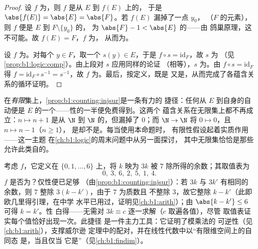 \begin{proof}
设 $f$ 为，则 $f$ 是从 $E$ 到 $f(E)$ 上的，
于是 $\abs{f(E)} = \abs{E} = \abs{F}$。若 $f(E)$ 漏掉了一点 $y_0$，
（$F$ 的元素），则 $f$ 便是 $E$ 到 $F \setminus \{y_0\}$ 的，
为 $\abs{F} - 1 < \abs{E}$ 的——由
鸽巢原理，这不可能。故 $f(E) = F$，$f$ 为，
从而为。

设 $f$ 为。对每个 $y \in F$，取一个 $s(y)
\in E$，于是 $f \circ s = \mathrm{id}_F$，故 $s$ 为
（见\cref{prop:b1:logic:comp}）。由上段对 $s$ 应用同样的论证
（相等），$s$ 为。由 $f \circ s =
\mathrm{id}_F$ 得 $f = \mathrm{id}_F \circ s^{-1} = s^{-1}$，故
$f$ 为。最后，按定义，既是
又是，从而完成了各蕴含关系的循环证明。
\end{proof}

\begin{example}[有限性至关重要]\label{ex:b1:counting:finiteonly}
在\emph{有限}集上，\cref{prop:b1:counting:injsur}是一条有力的
捷径：任何从 $E$ 到自身的自动便是
$E$ 的一个——性的一半便免费得到。这两个
蕴含关系在无限集上都不再成立：$n \mapsto n + 1$
是从 $\N$ 到 $\N$ 的，但漏掉了 $0$；而 $\N \to \N$
将 $0 \mapsto 0$，且 $n \mapsto n - 1$（$n \geq 1$），
是却不是。每当使用本命题时，
有限性假设起着实质作用——这一主题
在\cref{ch:b1:logic}的周末问题中从另一面探讨，
其中无限集恰恰是那些允许此类自的。
\end{example}

\begin{example}[白得的一半]\label{ex:b1:counting:mod7}
考虑 $f$，它定义在 $\{0, 1, \dots, 6\}$ 上，将 $k$ 映为
$3k$ 被 $7$ 除所得的余数；其取值表为
\[
0,\ 3,\ 6,\ 2,\ 5,\ 1,\ 4 .
\]
$f$ 是否为？仅性便已足够
（由\cref{prop:b1:counting:injsur}）：若 $3k$ 与 $3k'$ 有相同的
余数，则 $7$ 整除 $3(k - k')$，由于 $7$ 为质数且
不整除 $3$，故它整除 $k - k'$（此即欧几里得引理，在中学
水平已用过，证明见\cref{ch:b1:arith}）；由
$\abs{k - k'} \leq 6$ 可得 $k = k'$。性
白得——无需对 $3k \equiv c$ 逐一求解（$c$ 取遍各值），尽管
取值表证实每个值恰好出现一次。此捷径
是一件主力工具：它证明了模乘法的
可逆性（见\cref{ch:b1:arith}），支撑威尔逊
定理中的配对，并在线性代数中以“有限维空间上的自同态
是，当且仅当
它是”（见\cref{ch:b1:findim}）。
\end{example}

